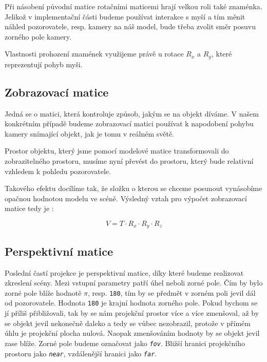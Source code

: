 Při násobení původní matice rotačními maticemi hrají  velkou roli také znaménka. Jelikož v implementační části budeme používat interakce s myší a tím měnit náhled pozorovatele, resp. kamery na náš model, bude třeba zvolit směr posuvu zorného pole kamery. 

Vlastnosti prohození znamének využijeme právě u  rotace $R_{x}$ a $R_{y}$, které reprezentují pohyb myši.  


\subsection{Zobrazovací matice}
Jedná se o matici, která kontroluje způsob, jakým se na objekt díváme. V našem konkrétním případě budeme zobrazovací matici používat k napodobení pohybu kamery snímající objekt, jak je tomu v reálném světě. 

Prostor objektu, který jsme pomocí modelové matice transformovali do zobrazitelného prostoru, musíme nyní převést do prostoru, který bude relativní vzhledem k pohledu pozorovatele.

Takového efektu docílíme tak, že složku o kterou se chceme posunout vynásobíme opačnou hodnotou modelu ve scéně. Výsledný vztah pro výpočet zobrazovací matice tedy je \cite{WebGLbeg}:

$$ V = T \cdot R_{x} \cdot R_{y} \cdot R_{z} $$ 

\newpage


\subsection{Perspektivní matice}
Poslední častí projekce je perspektivní matice, díky které budeme realizovat zkreslení scény. Mezi vstupní parametry patří úhel neboli zorné pole. Čím by bylo zorné pole blíže hodnotě $\pi$, resp. \texttt{180\degree}, tím by se předmět v zorném poli jevil dál od pozorovatele. \cite{webglFUND} Hodnota \texttt{180\degree} je krajní hodnota zorného pole. Pokud bychom se jí příliš přibližovali, tak by se nám projekční prostor více a více zmenšoval, až by se objekt jevil nekonečně daleko a tedy se vůbec nezobrazil, protože v přímém úhlu je projekční plocha nulová.  Naopak zmenšováním hodnoty by se objekt jevil zase blíže. Zorné pole budeme označovat jako \texttt{\textit{fov}}. Bližší hranici projekčního prostoru jako \texttt{\textit{near}}, vzdálenější hranici jako \texttt{\textit{far}}.



